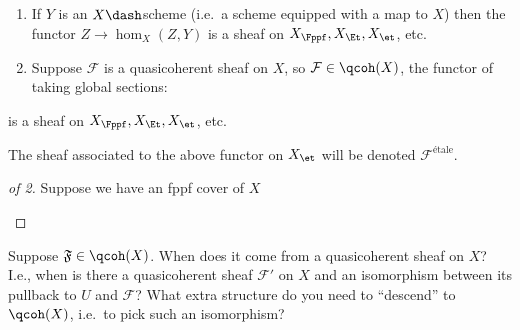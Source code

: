 \begin{theorem}

\envlist

\begin{enumerate}
\def\labelenumi{\arabic{enumi}.}
\item
  If \(Y\) is an \(X\dash\)scheme (i.e.~a scheme equipped with a map to
  \(X\)) then the functor \(Z \to \hom_X(Z, Y)\) is a sheaf on
  \(X_{\Fppf}, X_{\Et}, X_{\et}\), etc.
\item
  Suppose \(\mathcal{F}\) is a quasicoherent sheaf on \(X\), so
  \(\mathcal{F}\in \qcoh(X)\), the functor of taking global sections:
\end{enumerate}

\begin{center}
\end{center}

is a sheaf on \(X_{\Fppf}, X_{\Et}, X_{\et}\), etc.

\end{theorem}

\begin{definition}[$\mathcal{F}^{\et}$]

The sheaf associated to the above functor on \(X_{\et}\) will be denoted
\(\mathcal{F}^\text{étale}\).

\end{definition}

\begin{proof}[of 2]

Suppose we have an fppf cover of \(X\)

\begin{center}
\end{center}

\end{proof}

\begin{question}

Suppose \(\mathfrak{F}\in \qcoh(X)\). When does it come from a
quasicoherent sheaf on \(X\)? I.e., when is there a quasicoherent sheaf
\(\mathcal{F}'\) on \(X\) and an isomorphism between its pullback to
\(U\) and \(\mathcal{F}\)? What extra structure do you need to
``descend'' to \(\qcoh(X)\), i.e.~to pick such an isomorphism?

\end{question}

